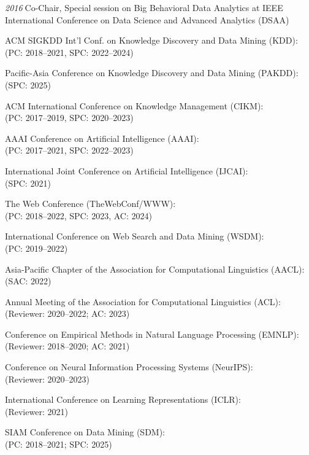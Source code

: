 \documentclass[10pt]{article}
\newenvironment{myindentpar}[1]%
{\begin{list}{}%
         {\setlength{\leftmargin}{#1}}%
         \item[]%
}
{\end{list}}
\newcounter{list}
\begin{document}
\begin{myindentpar}{0.75cm}
{\hspace{-0.75cm}\textit{2016}\textcolor{white}{.}Co-Chair, Special session on Big Behavioral Data Analytics at IEEE International Conference on Data Science and Advanced Analytics (DSAA)

}

\hspace{-0.75cm}{\bf (Senior) Program Committee / Reviewer / (Senior) Area Chair}

{\small

ACM SIGKDD Int'l Conf. on Knowledge Discovery and Data Mining (KDD): \\
(PC: 2018--2021, SPC: 2022--2024)

Pacific-Asia Conference on Knowledge Discovery and Data Mining (PAKDD): \\
(SPC: 2025)

ACM International Conference on Knowledge Management (CIKM): \\
(PC: 2017--2019, SPC: 2020--2023)

AAAI Conference on Artificial Intelligence (AAAI): \\
(PC: 2017--2021, SPC: 2022--2023)

International Joint Conference on Artificial Intelligence (IJCAI): \\
(SPC: 2021)

The Web Conference (TheWebConf/WWW): \\
(PC: 2018--2022, SPC: 2023, AC: 2024)

International Conference on Web Search and Data Mining (WSDM): \\
(PC: 2019--2022)

Asia-Pacific Chapter of the Association for Computational Linguistics (AACL): \\
(SAC: 2022)

Annual Meeting of the Association for Computational Linguistics (ACL): \\
(Reviewer: 2020--2022; AC: 2023)

Conference on Empirical Methods in Natural Language Processing (EMNLP): \\
(Reviewer: 2018--2020; AC: 2021)

Conference on Neural Information Processing Systems (NeurIPS): \\
(Reviewer: 2020--2023)

International Conference on Learning Representations (ICLR): \\
(Reviewer: 2021)

SIAM Conference on Data Mining (SDM): \\
(PC: 2018--2021; SPC: 2025)

}
\end{myindentpar}
\end{document}
